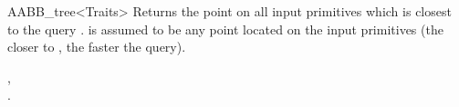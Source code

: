 \begin{ccRefClass}{AABB_tree<Traits>}
{Returns the point on all input primitives which is closest to the query .  is assumed to be any point located on the input primitives (the closer  to , the faster the query).}


\ccSeeAlso

, \\
.

\ccExample
{}

\end{ccRefClass}

\ccRefPageEnd

